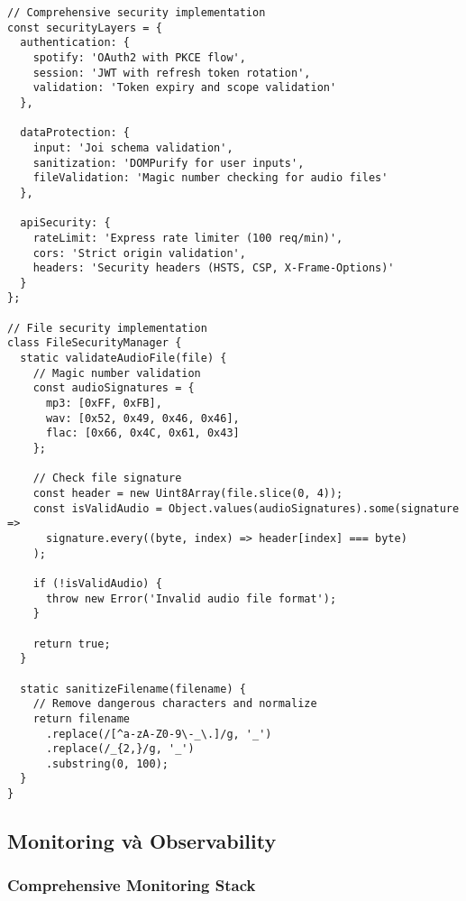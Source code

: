 \documentclass[12pt,a4paper]{article}
\begin{document}
\begin{lstlisting}[caption={Comprehensive security implementation}]
// Comprehensive security implementation
const securityLayers = {
  authentication: {
    spotify: 'OAuth2 with PKCE flow',
    session: 'JWT with refresh token rotation',
    validation: 'Token expiry and scope validation'
  },
  
  dataProtection: {
    input: 'Joi schema validation',
    sanitization: 'DOMPurify for user inputs',
    fileValidation: 'Magic number checking for audio files'
  },
  
  apiSecurity: {
    rateLimit: 'Express rate limiter (100 req/min)',
    cors: 'Strict origin validation',
    headers: 'Security headers (HSTS, CSP, X-Frame-Options)'
  }
};

// File security implementation
class FileSecurityManager {
  static validateAudioFile(file) {
    // Magic number validation
    const audioSignatures = {
      mp3: [0xFF, 0xFB],
      wav: [0x52, 0x49, 0x46, 0x46],
      flac: [0x66, 0x4C, 0x61, 0x43]
    };
    
    // Check file signature
    const header = new Uint8Array(file.slice(0, 4));
    const isValidAudio = Object.values(audioSignatures).some(signature =>
      signature.every((byte, index) => header[index] === byte)
    );
    
    if (!isValidAudio) {
      throw new Error('Invalid audio file format');
    }
    
    return true;
  }
  
  static sanitizeFilename(filename) {
    // Remove dangerous characters and normalize
    return filename
      .replace(/[^a-zA-Z0-9\-_\.]/g, '_')
      .replace(/_{2,}/g, '_')
      .substring(0, 100);
  }
}
\end{lstlisting}

\subsection{Monitoring và Observability}

\subsubsection{Comprehensive Monitoring Stack}
\end{document}

